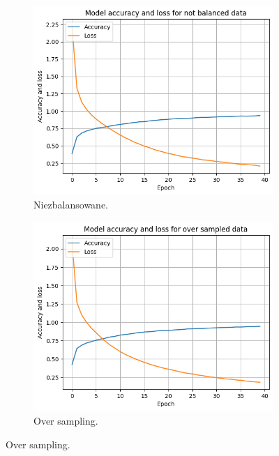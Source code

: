 \begin{figure}[H]
    \begin{subfigure}{.33\textwidth}
        \centering
        \includegraphics[width=\textwidth]{img/not_balanced_acc_loss.png}
        \caption{Niezbalansowane.}
        \label{fig:accu_loss_not_balanced}
    \end{subfigure}
    \begin{subfigure}{.33\textwidth}
        \centering
        \includegraphics[width=\textwidth]{img/over_acc_loss.png}
        \caption{Over sampling.}
        \label{fig:loss}
    \end{subfigure}

\end{figure}

